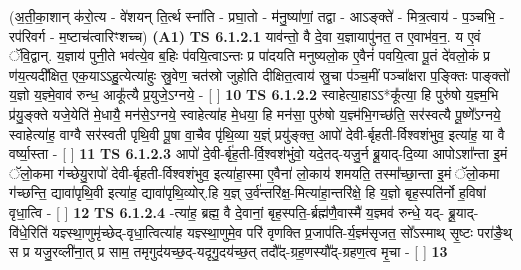 \documentclass[17pt]{extarticle}
\begin{document}
                  \newline
                      (अ॒ती॒का॒शान् क॑रो॒त्य - वे॑शयन् ति॒र्त्थ स्ना॑ति - प्रघा॒तो - म॑नु॒ष्या॑णां॒ तद्वा - आऽङ्क्ते॑ - मित्र॒त्वाय॑ - प॒ञ्चभि॒ - रप॑रिवर्ग - म॒ष्टाच॑त्वारिꣳशच्च)  \textbf{(A1)} \newline \newline
                                        \textbf{ TS 6.1.2.1} \newline
                  याव॑न्तो॒ वै दे॒वा य॒ज्ञायापु॑नत॒ त ए॒वाभ॑व॒न॒. य ए॒वं ॅवि॒द्वान्. य॒ज्ञाय॑ पुनी॒ते भव॑त्ये॒व ब॒हिः प॑वयि॒त्वाऽन्तः प्र पा॑दयति मनुष्यलो॒क ए॒वैनं॑ पवयि॒त्वा पू॒तं दे॑वलो॒कं प्र ण॑य॒त्यदी᳚क्षित॒ एक॒याऽऽहु॒त्येत्या॑हुः स्रु॒वेण॒ चत॑स्रो जुहोति दीक्षित॒त्वाय॑ स्रु॒चा प॑ञ्च॒मीं पञ्चा᳚क्षरा प॒ङ्क्तिः पाङ्क्तो॑ य॒ज्ञो य॒ज्ञ्मे॒वाव॑ रुन्ध॒ आकू᳚त्यै प्र॒युजे॒ऽग्नये॒ - [  ] \textbf{  10} \newline
                  \newline
                                \textbf{ TS 6.1.2.2} \newline
                  स्वाहेत्या॒हाऽऽ*कू᳚त्या॒ हि पुरु॑षो य॒ज्ञ्म॒भि प्र॑यु॒ङ्क्ते यजे॒येति॑ मे॒धायै॒ मन॑से॒ऽग्नये॒ स्वाहेत्या॑ह मे॒धया॒ हि मन॑सा॒ पुरु॑षो य॒ज्ञ्म॑भि॒गच्छ॑ति॒ सर॑स्वत्यै पू॒ष्णे᳚ऽग्नये॒ स्वाहेत्या॑ह॒ वाग्वै सर॑स्वती पृथि॒वी पू॒षा वा॒चैव पृ॑थि॒व्या य॒ज्ञ्ं प्रयु॑ङ्क्त॒ आपो॑ देवी-र्बृहती-र्विश्वशंभुव॒ इत्या॑ह॒ या वै वर्ष्या॒स्ता - [  ] \textbf{  11} \newline
                  \newline
                                \textbf{ TS 6.1.2.3} \newline
                  आपो॑ दे॒वी-र्बृ॑ह॒ती-र्वि॒श्वश॑भुंवो॒ यदे॒तद्-यजु॒र्न ब्रू॒याद्-दि॒व्या आपोऽशा᳚न्ता इ॒मं ॅलो॒कमा ग॑च्छेयु॒रापो॑ देवी-र्बृहती-र्विश्वशंभुव॒ इत्या॑हा॒स्मा ए॒वैना॑ लो॒काय॑ शमयति॒ तस्मा᳚च्छा॒न्ता इ॒मं ॅलो॒कमा ग॑च्छन्ति॒ द्यावा॑पृथि॒वी इत्या॑ह॒ द्यावा॑पृथि॒व्योर्.हि य॒ज्ञ् उ॒र्व॑न्तरि॑क्ष॒-मित्या॑हा॒न्तरि॑क्षे॒ हि य॒ज्ञो बृह॒स्पति॑र्नो ह॒विषा॑ वृधा॒त्वि - [  ] \textbf{  12} \newline
                  \newline
                                \textbf{ TS 6.1.2.4} \newline
                  -त्या॑ह॒ ब्रह्म॒ वै दे॒वानां॒ बृह॒स्पति॒-र्ब्रह्म॑णै॒वास्मै॑ य॒ज्ञ्मव॑ रुन्धे॒ यद्- ब्रू॒याद्-वि॑धे॒रिति॑ यज्ञ्स्था॒णुमृ॑च्छेद्-वृधा॒त्वित्या॑ह यज्ञ्स्था॒णुमे॒व परि॑ वृणक्ति प्र॒जाप॑ति-र्य॒ज्ञ्म॑सृजत॒ सो᳚ऽस्माथ् सृ॒ष्टः परा॑ङै॒थ् स प्र यजु॒रव्ली॑ना॒त् प्र साम॒ तमृगुद॑यच्छ॒द्-यदृगु॒दय॑च्छ॒त् तदौ᳚द्-ग्रह॒णस्यौ᳚द्-ग्रहण॒त्व मृ॒चा - [  ] \textbf{  13} \newline
\end{document}
